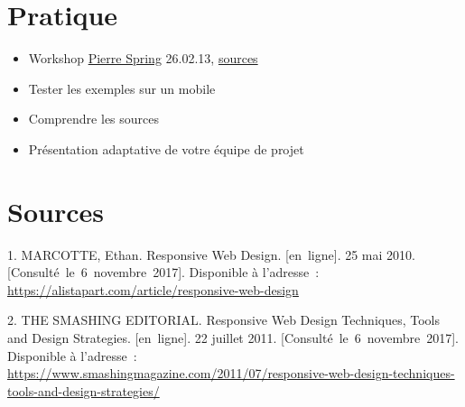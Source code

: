 \hypertarget{pratique}{%
\section{Pratique}\label{pratique}}

\begin{itemize}
\tightlist
\item
  Workshop \href{http://nelm.io/pierre}{Pierre Spring} 26.02.13,
  \href{http://goo.gl/gj8bke}{sources}
\item
  Tester les exemples sur un mobile
\item
  Comprendre les sources
\item
  Présentation adaptative de votre équipe de projet
\end{itemize}

\begin{otherlanguage}{english}

\end{otherlanguage}

\begin{otherlanguage}{english}

\end{otherlanguage}

\hypertarget{sources}{%
\section*{Sources}\label{sources}}

\hypertarget{refs}{}
\leavevmode\hypertarget{ref-alistapart:rwd}{}%
1. MARCOTTE, Ethan. Responsive Web Design. {[}en~ligne{]}. 25 mai 2010.
{[}Consulté~le~6~novembre~2017{]}. Disponible à l'adresse~:
\url{https://alistapart.com/article/responsive-web-design}

\leavevmode\hypertarget{ref-smashing:rwd}{}%
2. THE SMASHING EDITORIAL. Responsive Web Design Techniques, Tools and
Design Strategies. {[}en~ligne{]}. 22 juillet 2011.
{[}Consulté~le~6~novembre~2017{]}. Disponible à l'adresse~:
\url{https://www.smashingmagazine.com/2011/07/responsive-web-design-techniques-tools-and-design-strategies/}
